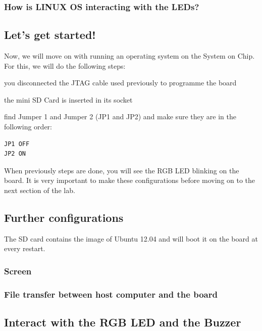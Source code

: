 \subsubsection{How is LINUX OS interacting with the LEDs?}


\subsection{Let's get started!}

Now, we will move on with running an operating system on the System on Chip. For this, we will do the following steps:
\begin{myitemize}
\item you disconnected the JTAG cable used previously to programme the board
\item the mini SD Card is inserted in its socket
\item find Jumper 1 and Jumper 2 (JP1 and JP2) and make sure they are in the following order:
\begin{verbatim}
JP1 OFF 
JP2 ON
\end{verbatim}
\end{myitemize}


When previously steps are done, you will see the RGB LED blinking on the board. It is very
important to make these configurations before moving on to the next section of the lab.

\subsection{Further configurations}

The SD card contains the image of Ubuntu 12.04 and will boot it on the board at every restart.

\subsubsection{Screen}

\subsubsection{File transfer between host computer and the board}




\subsection{Interact with the RGB LED and the Buzzer}




